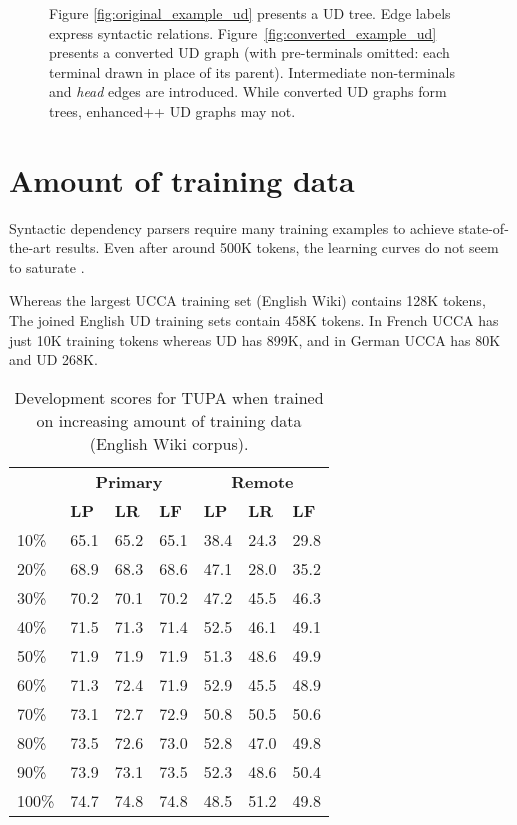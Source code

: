 \documentclass[11pt,a4paper]{article}
\begin{document}
\begin{figure}[!ht]
\caption{Figure \ref{fig:original_example_ud} presents a UD tree.
  Edge labels express syntactic relations.
Figure~\ref{fig:converted_example_ud} presents a converted UD graph
(with pre-terminals omitted: each terminal drawn in place of its parent).
Intermediate non-terminals and \textit{head} edges are introduced.
While converted UD graphs form trees, enhanced++ UD graphs may not.}\label{fig:ud_examples}
\end{figure}


\section{Amount of training data}\label{sec:data_size}

Syntactic dependency parsers require many training examples to achieve
state-of-the-art results.
Even after around 500K tokens, the learning curves do not seem to saturate
\cite{de2017old,velldal2017joint}.

Whereas the largest UCCA training set (English Wiki) contains 128K tokens,
The joined English UD training sets contain 458K tokens.
In French UCCA has just 10K training tokens whereas UD has 899K,
and in German UCCA has 80K and UD 268K.

\begin{table}[t]
\centering
\begin{tabular}{l|lll|lll}
& \multicolumn{3}{c|}{\footnotesize \bf Primary} & \multicolumn{3}{c}{\footnotesize \bf Remote} \\
& \footnotesize \textbf{LP} & \footnotesize \textbf{LR} & \footnotesize \textbf{LF}
& \footnotesize \textbf{LP} & \footnotesize \textbf{LR} & \footnotesize \textbf{LF} \\
\hline
\footnotesize 10\% & 65.1 & 65.2 & 65.1 & 38.4 & 24.3 & 29.8\\
\footnotesize 20\% & 68.9 & 68.3 & 68.6 & 47.1 & 28.0 & 35.2\\
\footnotesize 30\% & 70.2 & 70.1 & 70.2 & 47.2 & 45.5 & 46.3\\
\footnotesize 40\% & 71.5 & 71.3 & 71.4 & 52.5 & 46.1 & 49.1\\
\footnotesize 50\% & 71.9 & 71.9 & 71.9 & 51.3 & 48.6 & 49.9\\
\footnotesize 60\% & 71.3 & 72.4 & 71.9 & 52.9 & 45.5 & 48.9\\
\footnotesize 70\% & 73.1 & 72.7 & 72.9 & 50.8 & 50.5 & 50.6\\
\footnotesize 80\% & 73.5 & 72.6 & 73.0 & 52.8 & 47.0 & 49.8\\
\footnotesize 90\% & 73.9 & 73.1 & 73.5 & 52.3 & 48.6 & 50.4\\
\footnotesize 100\% & 74.7 & 74.8 & 74.8 & 48.5 & 51.2 & 49.8\\
\end{tabular}
\caption{
Development scores for TUPA \protect\cite{hershcovich2017a} when trained on increasing amount of training data
(English Wiki corpus).
\label{tab:partial_data_results}}
\end{table}
\end{document}
